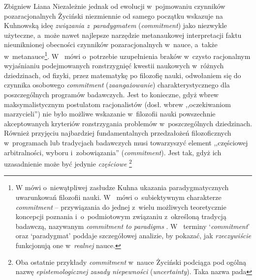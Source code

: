 \begin{artplenv}{Zbigniew Liana}
Niezależnie jednak od ewolucji w~pojmowaniu czynników pozaracjonalnych Życiński niezmiennie od samego początku wskazuje
na Kuhnowską ideę \textit{związania z~paradygmatem }(\textit{commitment}) jako niezwykle użyteczne, a~może nawet najlepsze
narzędzie metanaukowej interpretacji faktu nieuniknionej obecności czynników
pozaracjonalnych w~nauce, a~także w~metanauce\footnote{W
\parencite[s.~153]{zycinski_jezyk_1983}
mówi o~niewątpliwej
zasłudze Kuhna ukazania paradygmatycznych uwarunkowań filozofii nauki.
W~\parencite[s.~160]{zycinski_teizm_1985}
mówi o~subiektywnym charakterze \textit{commitment} -- przywiązania do jednej z~wielu możliwych
teoretycznie koncepcji poznania i~o~podmiotowym związaniu z~określoną tradycją badawczą, nazywanym \textit{commitment to
paradigms}
\parencite*[s.~164]{zycinski_teizm_1985}.
W~\parencite[s.~191–200]{zycinski_elementy_1996}
terminy `\textit{commitment}' oraz `paradygmat' poddaje szczegółowej analizie, by pokazać, jak
\textit{rzeczywiście} funkcjonują one w~\textit{realnej} nauce.}.
W~\parencites[s.~136n]{zycinski_structure_1988}[s.~241n]{zycinski_struktura_2013}
mówi o~potrzebie uzupełnienia braków w~czysto racjonalnym wyjaśnianiu
podejmowanych rozstrzygnięć kwestii naukowych w~różnych dziedzinach, od fizyki, przez matematykę po filozofię nauki,
odwołaniem się do czynnika osobowego \textit{commitment} (\textit{zaangażowanie}) charakterystycznego dla poszczególnych
programów badawczych. Jest to konieczne, gdyż wbrew maksymalistycznym postulatom racjonalistów (dosł. wbrew
,,oczekiwaniom marzycieli'') nie było możliwe wskazanie w~filozofii nauki powszechnie akceptowanych kryteriów
rozstrzygania problemów w~poszczególnych dziedzinach. Również przyjęciu najbardziej fundamentalnych przedzałożeń
filozoficznych w~programach lub tradycjach badawczych musi towarzyszyć element ,,częściowej arbitralności,
wyboru i~zobowiązania'' (\textit{commitment}).
Jest tak, gdyż ich uzasadnienie może być jedynie \textit{częściowe}
\parencites[zob.][s.~143]{zycinski_structure_1988}[s.~253n]{zycinski_struktura_2013}\footnote{\label{lia-foo-55}Oba
ostatnie przykłady \textit{commitment} w~nauce
Życiński podciąga pod ogólną nazwę \textit{epistemologicznej zasady niepewności} (\textit{uncertainty}). Taka nazwa pada
}
\end{artplenv}

